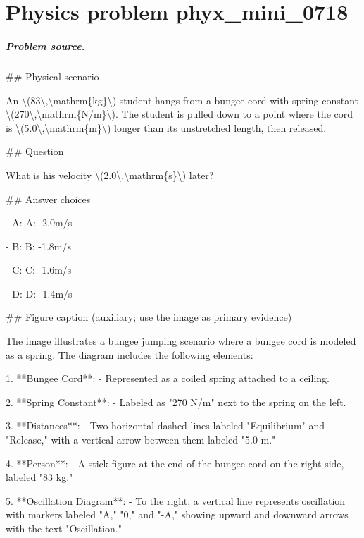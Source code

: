 
\chapter{Physics problem phyx\_mini\_0718}
\label{ch:PhyXMiniProblems_problem_phyx_mini_0718}

\paragraph{Problem source.}
\#\# Physical scenario

An \textbackslash{}(83\textbackslash{},\textbackslash{}mathrm\{kg\}\textbackslash{}) student hangs from a bungee cord with spring constant \textbackslash{}(270\textbackslash{},\textbackslash{}mathrm\{N/m\}\textbackslash{}). The student is pulled down to a point where the cord is \textbackslash{}(5.0\textbackslash{},\textbackslash{}mathrm\{m\}\textbackslash{}) longer than its unstretched length, then released.

\#\# Question

What is his velocity \textbackslash{}(2.0\textbackslash{},\textbackslash{}mathrm\{s\}\textbackslash{}) later?

\#\# Answer choices

- A: A: -2.0m/s

- B: B: -1.8m/s

- C: C: -1.6m/s

- D: D: -1.4m/s

\#\# Figure caption (auxiliary; use the image as primary evidence)

The image illustrates a bungee jumping scenario where a bungee cord is modeled as a spring. The diagram includes the following elements:

1. **Bungee Cord**: 
   - Represented as a coiled spring attached to a ceiling.

2. **Spring Constant**: 
   - Labeled as "270 N/m" next to the spring on the left.

3. **Distances**:
   - Two horizontal dashed lines labeled "Equilibrium" and "Release," with a vertical arrow between them labeled "5.0 m."

4. **Person**:
   - A stick figure at the end of the bungee cord on the right side, labeled "83 kg."

5. **Oscillation Diagram**:
   - To the right, a vertical line represents oscillation with markers labeled "A," "0," and "-A," showing upward and downward arrows with the text "Oscillation."

